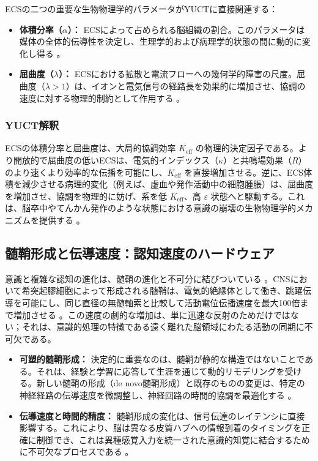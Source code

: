 \documentclass[12pt,a4paper]{article}
\begin{document}
	ECSの二つの重要な生物物理学的パラメータがYUCTに直接関連する：
	
	\begin{itemize}
		\item \textbf{体積分率（\(\alpha\)）：} ECSによって占められる脳組織の割合。このパラメータは媒体の全体的伝導性を決定し、生理学的および病理学的状態の間に動的に変化し得る \cite{Sykova2008}。
		\item \textbf{屈曲度（\(\lambda\)）：} ECSにおける拡散と電流フローへの幾何学的障害の尺度。屈曲度（\(\lambda > 1\)）は、イオンと電気信号の経路長を効果的に増加させ、協調の速度に対する物理的制約として作用する \cite{Nicholson2006}。
	\end{itemize}
	
	\subsubsection*{YUCT解釈}
	ECSの体積分率と屈曲度は、大局的協調効率 \(K_{\mathrm{eff}}\) の物理的決定因子である。より開放的で屈曲度の低いECSは、電気的インデックス（\(\kappa\)）と共鳴場効果（\(R\)）のより速くより効率的な伝播を可能にし、\(K_{\mathrm{eff}}\) を直接増加させる。逆に、ECS体積を減少させる病理的変化（例えば、虚血や発作活動中の細胞腫脹）は、屈曲度を増加させ、協調を物理的に妨げ、系を低 \(K_{\mathrm{eff}}\)、高 \(\varepsilon\) 状態へと駆動する。これは、脳卒中やてんかん発作のような状態における意識の崩壊の生物物理学的メカニズムを提供する \cite{Arranz2023}。
	
	\subsection{髄鞘形成と伝導速度：認知速度のハードウェア}
	
	意識と複雑な認知の進化は、髄鞘の進化と不可分に結びついている \cite{Fields2008}。CNSにおいて希突起膠細胞によって形成される髄鞘は、電気的絶縁体として働き、跳躍伝導を可能にし、同じ直径の無髄軸索と比較して活動電位伝播速度を最大100倍まで増加させる \cite{Waxman1980}。この速度の劇的な増加は、単に迅速な反射のためだけではない；それは、意識的処理の特徴である遠く離れた脳領域にわたる活動の同期に不可欠である。
	
	\begin{itemize}
		\item \textbf{可塑的髄鞘形成：} 決定的に重要なのは、髄鞘が静的な構造ではないことである。それは、経験と学習に応答して生涯を通じて動的リモデリングを受ける。新しい髄鞘の形成（de novo髄鞘形成）と既存のものの変更は、特定の神経経路の伝導速度を微調整し、神経回路の時間的協調を最適化する \cite{deFaria2021, Monje2023}。
		\item \textbf{伝導速度と時間的精度：} 髄鞘形成の変化は、信号伝達のレイテンシに直接影響する。これにより、脳は異なる皮質ハブへの情報到着のタイミングを正確に制御でき、これは異種感覚入力を統一された意識的知覚に結合するために不可欠なプロセスである \cite{Pajevic2014}。
	\end{itemize}
	
\end{document}

